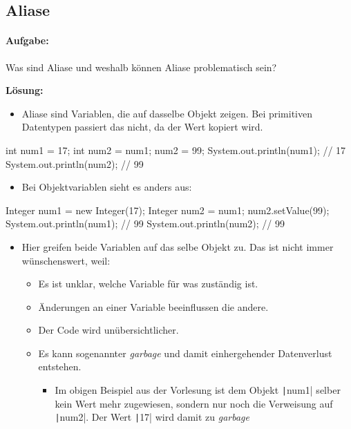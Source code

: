 \documentclass[a4paper,10pt, dvipsnames]{report}
\begin{document}
\subsection{Aliase}

\paragraph{Aufgabe:}
Was sind Aliase und weshalb können Aliase problematisch sein?

\textbf{Lösung:}

\begin{itemize}
    \item Aliase sind Variablen, die auf dasselbe Objekt zeigen. Bei primitiven Datentypen passiert das nicht, da der Wert kopiert wird.
\end{itemize}

\begin{javacodebox}
int num1 = 17;
int num2 = num1;
num2 = 99; System.out.println(num1); // 17
System.out.println(num2); // 99
\end{javacodebox}

\begin{itemize}
    \item Bei Objektvariablen sieht es anders aus:
\end{itemize}

\begin{javacodebox}
Integer num1 = new Integer(17);
Integer num2 = num1;
num2.setValue(99);
System.out.println(num1); // 99
System.out.println(num2); // 99
\end{javacodebox}

\begin{itemize}
    \item Hier greifen beide Variablen auf das selbe Objekt zu. Das ist nicht immer wünschenswert, weil:
    \begin{itemize}
        \item Es ist unklar, welche Variable für was zuständig ist.
        \item Änderungen an einer Variable beeinflussen die andere.
        \item Der Code wird unübersichtlicher.
        \item Es kann sogenannter \textit{garbage} und damit einhergehender Datenverlust entstehen.
        \begin{itemize}
            \item Im obigen Beispiel aus der Vorlesung ist dem Objekt \texttt|num1| selber kein Wert mehr zugewiesen, sondern nur noch die Verweisung auf \texttt|num2|. Der Wert \texttt|17| wird damit zu \textit{garbage}
        \end{itemize}
    \end{itemize}
\end{itemize}
\end{document}
